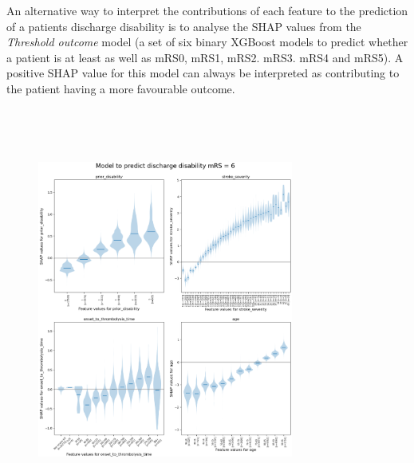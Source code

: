 An alternative way to interpret the contributions of each feature to the prediction of a patients discharge disability is to analyse the SHAP values from the \textit{Threshold outcome} model (a set of six binary XGBoost models to predict whether a patient is at least as well as mRS0, mRS1, mRS2. mRS3. mRS4 and mRS5). A positive SHAP value for this model can always be interpreted as contributing to the patient having a more favourable outcome.

\begin{figure}
\\
\caption{}
\end{figure}

\begin{figure}
\\
\caption{}
\end{figure}






\begin{figure}[!h]
    \centering    
    \includegraphics[width=0.75\textwidth]
    {./images/043_outcome_mrs6_violin_plots.png}\\
    \caption{}
    \label{fig:mrs6_violin}
\end{figure}

